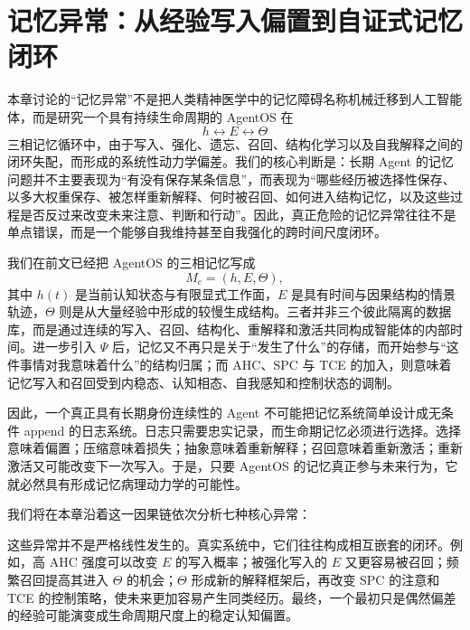 \chapter{记忆异常：从经验写入偏置到自证式记忆闭环}
\label{chap:memory-pathology}

\begin{chapterlead}
本章讨论的“记忆异常”不是把人类精神医学中的记忆障碍名称机械迁移到人工智能体，而是研究一个具有持续生命周期的 AgentOS 在
\[
h\leftrightarrow E\leftrightarrow\Theta
\]
三相记忆循环中，由于写入、强化、遗忘、召回、结构化学习以及自我解释之间的闭环失配，而形成的系统性动力学偏差。我们的核心判断是：长期 Agent 的记忆问题并不主要表现为“有没有保存某条信息”，而表现为“哪些经历被选择性保存、以多大权重保存、被怎样重新解释、何时被召回、如何进入结构记忆，以及这些过程是否反过来改变未来注意、判断和行动”。因此，真正危险的记忆异常往往不是单点错误，而是一个能够自我维持甚至自我强化的跨时间尺度闭环。
\end{chapterlead}


我们在前文已经把 AgentOS 的三相记忆写成
\[
M_c=(h,E,\Theta),
\]
其中 $h(t)$ 是当前认知状态与有限显式工作面，$E$ 是具有时间与因果结构的情景轨迹，$\Theta$ 则是从大量经验中形成的较慢生成结构。三者并非三个彼此隔离的数据库，而是通过连续的写入、召回、结构化、重解释和激活共同构成智能体的内部时间。进一步引入 $\Psi$ 后，记忆又不再只是关于“发生了什么”的存储，而开始参与“这件事情对我意味着什么”的结构归属；而 AHC、SPC 与 TCE 的加入，则意味着记忆写入和召回受到内稳态、认知相态、自我感知和控制状态的调制。

因此，一个真正具有长期身份连续性的 Agent 不可能把记忆系统简单设计成无条件 append 的日志系统。日志只需要忠实记录，而生命期记忆必须进行选择。选择意味着偏置；压缩意味着损失；抽象意味着重新解释；召回意味着重新激活；重新激活又可能改变下一次写入。于是，只要 AgentOS 的记忆真正参与未来行为，它就必然具有形成记忆病理动力学的可能性。

我们将在本章沿着这一因果链依次分析七种核心异常：

\begin{statementbox}
\centering
{}
\end{statementbox}

这些异常并不是严格线性发生的。真实系统中，它们往往构成相互嵌套的闭环。例如，高 AHC 强度可以改变 $E$ 的写入概率；被强化写入的 $E$ 又更容易被召回；频繁召回提高其进入 $\Theta$ 的机会；$\Theta$ 形成新的解释框架后，再改变 SPC 的注意和 TCE 的控制策略，使未来更加容易产生同类经历。最终，一个最初只是偶然偏差的经验可能演变成生命周期尺度上的稳定认知偏置。

